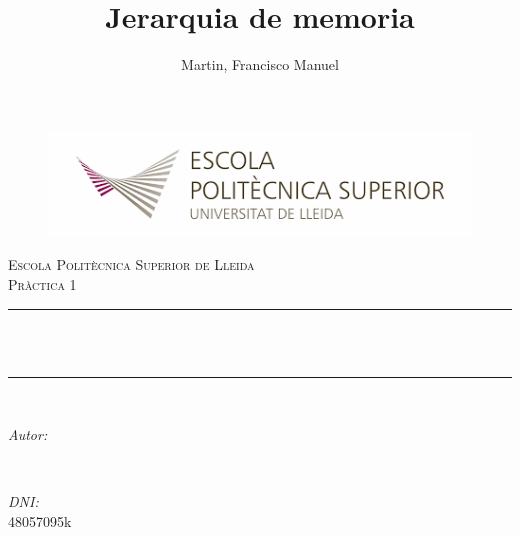 \documentclass{article}
\title{Jerarquia de memoria}
\author{Martin, Francisco Manuel
}
\makeatletter
\let\thetitle\@title
\let\theauthor\@author
\let\thedate\@date
\makeatother
\begin{document}
    \begin{titlepage}
        \begin{figure}[h]

            \includegraphics[scale=0.38]{1}
        \end{figure}
        \centering
        \vspace*{0.5 cm}

        \textsc{\LARGE Escola Politècnica Superior de Lleida}\\[2.0 cm]    %
        \textsc{\large Pràctica 1}\\[0.5 cm]                %
        \rule{\linewidth}{0.2 mm} \\[0.4 cm]
        { \huge \bfseries \thetitle}\\
        \rule{\linewidth}{0.2 mm} \\[1.5 cm]

        \begin{minipage}{0.4\textwidth}
            \begin{flushleft}
                \large
                \emph{Autor:}\\
                \theauthor
            \end{flushleft}
        \end{minipage}~
        \begin{minipage}{0.4\textwidth}
            \begin{flushright}
                \large
                \emph{DNI:} \\
                48057095k %
            \end{flushright}
        \end{minipage}\\[2 cm]

        {\large \thedate}\\[2 cm]

        \vfill

    \end{titlepage}
\end{document}
